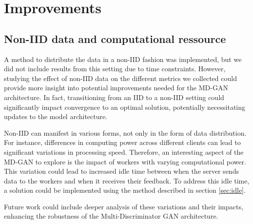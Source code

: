 \chapter{Improvements}

\section{Non-IID data and computational ressource}
A method to distribute the data in a non-IID fashion was implemented, but we did not include results from this setting due to time constraints. However, studying the effect of non-IID data on the different metrics we collected could provide more insight into potential improvements needed for the MD-GAN architecture. In fact, transitioning from an IID to a non-IID setting could significantly impact convergence to an optimal solution, potentially necessitating updates to the model architecture.

Non-IID can manifest in various forms, not only in the form of data distribution. For instance, differences in computing power across different clients can lead to significant variations in processing speed. Therefore, an interesting aspect of the MD-GAN to explore is the impact of workers with varying computational power. This variation could lead to increased idle time between when the server sends data to the workers and when it receives their feedback. To address this idle time, a solution could be implemented using the method described in section \ref{sec:idle}.

Future work could include deeper analysis of these variations and their impacts, enhancing the robustness of the Multi-Discriminator GAN architecture.



